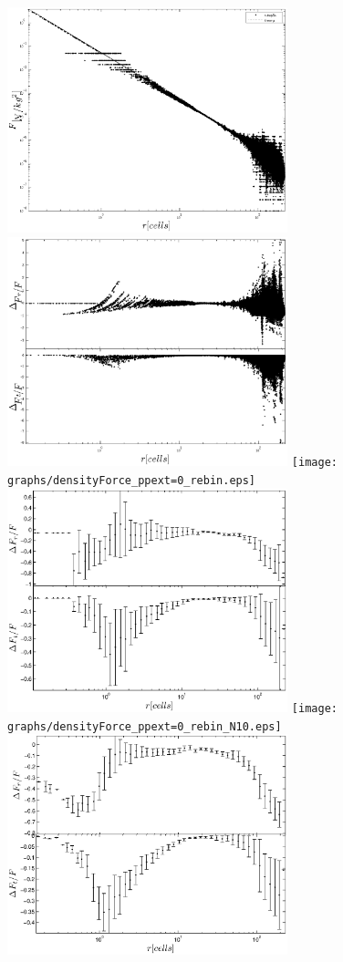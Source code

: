 \begin{figure}%
  \begin{center}
    \includegraphics[width=3.2in]{graphs/densityForce_ppext=0.eps}
    \includegraphics[width=3.2in]{graphs/densityForce_fracErr.eps}
    \texttt{[image: graphs/densityForce\_ppext=0\_rebin.eps]}
    \includegraphics[width=3.2in]{graphs/densityForce_fracErr_ppext=0_rebin.eps}
    \texttt{[image: graphs/densityForce\_ppext=0\_rebin\_N10.eps]}
    \includegraphics[width=3.2in]{graphs/densityForce_fracErr_ppext=0_rebin_N10.eps}

\end{center}
\end{figure}
